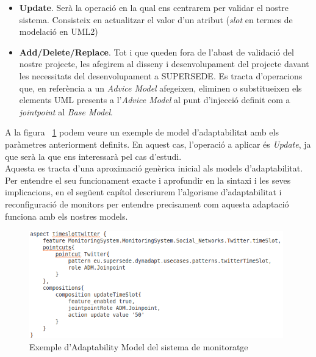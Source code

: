 \begin{itemize}
\begin{itemize}
\begin{itemize}
\item \textbf{Update}. Serà la operació en la qual ens centrarem per validar el nostre sistema. Consisteix en actualitzar el valor d'un atribut (\textit{slot} en termes de modelació en UML2)
\item \textbf{Add/Delete/Replace}. Tot i que queden fora de l'abast de validació del nostre projecte, les afegirem al disseny i desenvolupament del projecte davant les necessitats del desenvolupament a SUPERSEDE. Es tracta d'operacions que, en referència a un \textit{Advice Model} afegeixen, eliminen o substitueixen els elements UML presents a l'\textit{Advice Model} al punt d'injecció definit com a \textit{jointpoint} al \textit{Base Model}.
\end{itemize}
\end{itemize}
\end{itemize}

A la figura ~\ref{fig:aspect} podem veure un exemple de model d'adaptabilitat amb els paràmetres anteriorment definits. En aquest cas, l'operació a aplicar és \textit{Update}, ja que serà la que ens interessarà pel cas d'estudi.\\

Aquesta es tracta d'una aproximació genèrica inicial als models d'adaptabilitat. Per entendre el seu funcionament exacte i aprofundir en la sintaxi i les seves implicacions, en el següent capítol descriurem l'algorisme d'adaptabilitat i reconfiguració de monitors per entendre precisament com aquesta adaptació funciona amb els nostres models.\\

\begin{figure}
\centering
\includegraphics[width=11cm]{Figures/Figure38}
\decoRule
\caption{Exemple d'Adaptability Model del sistema de monitoratge}
\label{fig:aspect}
\end{figure}